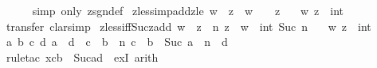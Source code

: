 \begin{isabellebody}
\ \ \ \ \isamarkupfalse%
\ {\isacharparenleft}{\kern0pt}simp\ only{\isacharcolon}{\kern0pt}\ zsgn{\isacharunderscore}{\kern0pt}def{\isacharparenright}{\kern0pt}\isanewline
{}\isamarkupfalse%
%
\endisatagproof
{\isafoldproof}%
%
\isadelimproof
\isanewline
%
\endisadelimproof
\isanewline
{}\isamarkupfalse%
\isanewline
\isanewline
{}\isamarkupfalse%
\ zless{\isacharunderscore}{\kern0pt}imp{\isacharunderscore}{\kern0pt}add{}{\isacharunderscore}{\kern0pt}zle{\isacharcolon}{\kern0pt}\ {\isachardoublequoteopen}w\ {\isacharless}{\kern0pt}\ z\ {\isasymLongrightarrow}\ w\ {\isacharplus}{\kern0pt}\ {}\ {\isasymle}\ z{\isachardoublequoteclose}\isanewline
\ \ \ w\ z\ {\isacharcolon}{\kern0pt}{\isacharcolon}{\kern0pt}\ int\isanewline
%
\isadelimproof
\ \ %
\endisadelimproof
%
\isatagproof
{}\isamarkupfalse%
\ transfer\ clarsimp%
\endisatagproof
{\isafoldproof}%
%
\isadelimproof
\isanewline
%
\endisadelimproof
\isanewline
{}\isamarkupfalse%
\ zless{\isacharunderscore}{\kern0pt}iff{\isacharunderscore}{\kern0pt}Suc{\isacharunderscore}{\kern0pt}zadd{\isacharcolon}{\kern0pt}\ {\isachardoublequoteopen}w\ {\isacharless}{\kern0pt}\ z\ {\isasymlongleftrightarrow}\ {\isacharparenleft}{\kern0pt}{\isasymexists}n{\isachardot}{\kern0pt}\ z\ {\isacharequal}{\kern0pt}\ w\ {\isacharplus}{\kern0pt}\ int\ {\isacharparenleft}{\kern0pt}Suc\ n{\isacharparenright}{\kern0pt}{\isacharparenright}{\kern0pt}{\isachardoublequoteclose}\isanewline
\ \ \ w\ z\ {\isacharcolon}{\kern0pt}{\isacharcolon}{\kern0pt}\ int\isanewline
%
\isadelimproof
%
\endisadelimproof
%
\isatagproof
{}\isamarkupfalse%
\ {\isacharminus}{\kern0pt}\isanewline
\ \ \isamarkupfalse%
\ {\isachardoublequoteopen}{\isasymAnd}a\ b\ c\ d{\isachardot}{\kern0pt}\ a\ {\isacharplus}{\kern0pt}\ d\ {\isacharless}{\kern0pt}\ c\ {\isacharplus}{\kern0pt}\ b\ {\isasymLongrightarrow}\ {\isasymexists}n{\isachardot}{\kern0pt}\ c\ {\isacharplus}{\kern0pt}\ b\ {\isacharequal}{\kern0pt}\ Suc\ {\isacharparenleft}{\kern0pt}a\ {\isacharplus}{\kern0pt}\ n\ {\isacharplus}{\kern0pt}\ d{\isacharparenright}{\kern0pt}{\isachardoublequoteclose}\isanewline
\ \ \ \ \isamarkupfalse%
\ {\isacharparenleft}{\kern0pt}rule{\isacharunderscore}{\kern0pt}tac\ x{\isacharequal}{\kern0pt}{\isachardoublequoteopen}c{\isacharplus}{\kern0pt}b\ {\isacharminus}{\kern0pt}\ Suc{\isacharparenleft}{\kern0pt}a{\isacharplus}{\kern0pt}d{\isacharparenright}{\kern0pt}{\isachardoublequoteclose}\ \ exI{\isacharparenright}{\kern0pt}\ arith\isanewline

\end{isabellebody}
